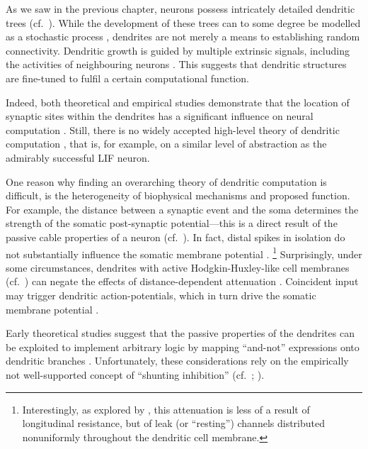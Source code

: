 

As we saw in the previous chapter, neurons possess intricately detailed dendritic trees (cf.~).
While the development of these trees can to some degree be modelled as a stochastic process \citep[e.g.,][]{nowakowski1992competitive}, dendrites are not merely a means to establishing random connectivity.
Dendritic growth is guided by multiple extrinsic signals, including the activities of neighbouring neurons \citep{mcallister2000cellular}.
This suggests that dendritic structures are fine-tuned to fulfil a certain computational function.

Indeed, both theoretical and empirical studies demonstrate that the location of synaptic sites within the dendrites has a significant influence on neural computation \citep{mel1994information,koch2002singlecell,polsky2004computational}.
Still, there is no widely accepted high-level theory of dendritic computation \citep{london2005dendritic}, that is, for example, on a similar level of abstraction as the admirably successful LIF neuron.

One reason why finding an overarching theory of dendritic computation is difficult, is the heterogeneity of biophysical mechanisms and proposed function.
For example, the distance between a synaptic event and the soma determines the strength of the somatic post-synaptic potential---this is a direct result of the passive cable properties of a neuron (cf.~).
In fact, distal spikes in isolation do not substantially influence the somatic membrane potential \citep{stuart1998determinants}.%
\footnote{Interestingly, as explored by \citet{stuart1998determinants}, this attenuation is less of a result of longitudinal resistance, but of leak (or \enquote{resting}) channels distributed nonuniformly throughout the dendritic cell membrane.}
Surprisingly, under some circumstances, dendrites with active Hodgkin-Huxley-like cell membranes (cf.~) can negate the effects of distance-dependent attenuation \citep{koch2002singlecell}.
Coincident input may trigger dendritic action-potentials, which in turn drive the somatic membrane potential \citep{williams2002dependence}.

Early theoretical studies suggest that the passive properties of the dendrites can be exploited to implement arbitrary logic by mapping \enquote{and-not} expressions onto dendritic branches \citep{koch1983nonlinear,mel1994information,london2005dendritic}.
Unfortunately, these considerations rely on the empirically not well-supported concept of \enquote{shunting inhibition} (cf.~; \cite{holt1997shunting,abbott2005drivers}).

